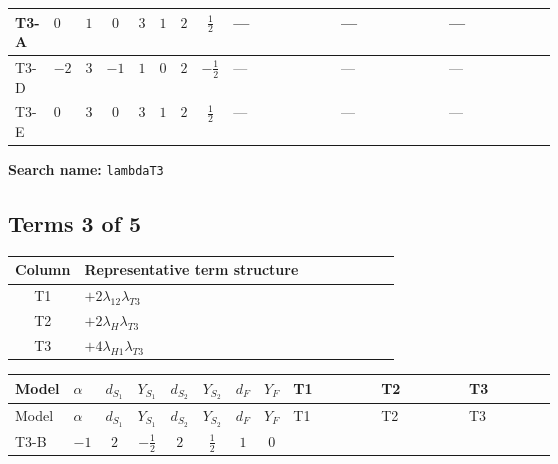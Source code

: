 \documentclass[8pt]{article}
\begin{document}
\begin{landscape}
\begin{longtable}{@{}llcccccc >{\raggedright\arraybackslash}p{0.21\linewidth} >{\raggedright\arraybackslash}p{0.21\linewidth} >{\raggedright\arraybackslash}p{0.21\linewidth}@{}}
\midrule
T3-A & $0$ & $1$ & $0$ & $3$ & $1$ & $2$ & $\frac{1}{2}$ & --- & --- & --- \\
\midrule
T3-D & $-2$ & $3$ & $-1$ & $1$ & $0$ & $2$ & $-\frac{1}{2}$ & --- & --- & --- \\
\midrule
T3-E & $0$ & $3$ & $0$ & $3$ & $1$ & $2$ & $\frac{1}{2}$ & --- & --- & --- \\
\midrule
\bottomrule
\end{longtable}
\clearpage
\noindent\textbf{Search name: }\texttt{lambdaT3}\par\smallskip
\subsection*{Terms 3 of 5}
\begin{center}
\begin{tabular}{@{}c >{\raggedright\arraybackslash}p{0.82\linewidth}@{}}
\toprule
Column & Representative term structure \\
\midrule
T1 & \(\displaystyle +2 {\lambda_{12}} {\lambda_{T3}}\) \\
\midrule
T2 & \(\displaystyle +2 {\lambda_H} {\lambda_{T3}}\) \\
\midrule
T3 & \(\displaystyle +4 {\lambda_{H1}} {\lambda_{T3}}\) \\
\midrule
\bottomrule
\end{tabular}
\end{center}
\smallskip
\tiny
\begin{longtable}{@{}llcccccc >{\raggedright\arraybackslash}p{0.21\linewidth} >{\raggedright\arraybackslash}p{0.21\linewidth} >{\raggedright\arraybackslash}p{0.21\linewidth}@{}}
\toprule
Model & $\alpha$ & $d_{S_1}$ & $Y_{S_1}$ & $d_{S_2}$ & $Y_{S_2}$ & $d_F$ & $Y_F$ & T1 & T2 & T3 \\
\midrule
\endfirsthead
\toprule
Model & $\alpha$ & $d_{S_1}$ & $Y_{S_1}$ & $d_{S_2}$ & $Y_{S_2}$ & $d_F$ & $Y_F$ & T1 & T2 & T3 \\
\midrule
\endhead
T3-B & $-1$ & $2$ & $-\frac{1}{2}$ & $2$ & $\frac{1}{2}$ & $1$ & $0$ & \scriptsize\adjustbox{max width=\linewidth}{$\begin{gathered} +2 {\lambda_{12}} {\lambda_{T3}}\end{gathered}$} & \scriptsize\adjustbox{max width=\linewidth}{$\begin{gathered} +2 {\lambda_H} {\lambda_{T3}}\end{gathered}$} & \scriptsize\adjustbox{max width=\linewidth}{$\begin{gathered} +4 {\lambda_{H1}} {\lambda_{T3}}\end{gathered}$} \\

\end{longtable}
\end{landscape}
\end{document}
